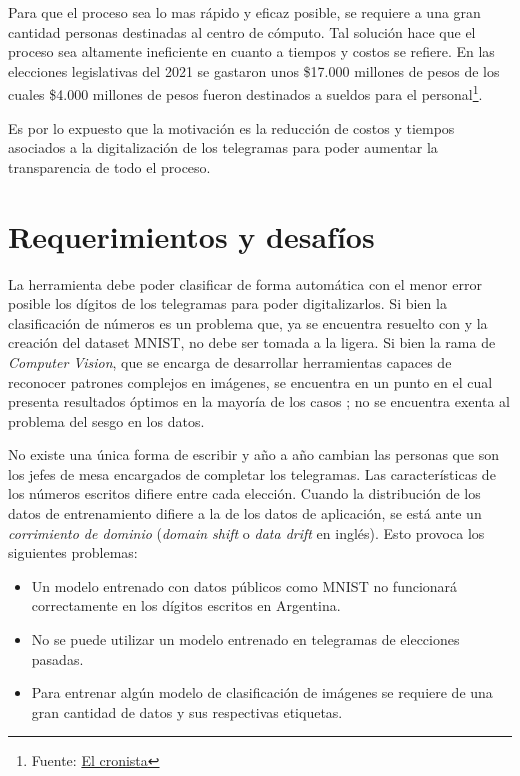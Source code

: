 \documentclass[a4paper, twoside, spanish]{report}
\begin{document}
Para que el proceso sea lo mas r\'apido y eficaz posible, se requiere a una gran cantidad personas destinadas al centro
de c\'omputo. Tal soluci\'on hace que el proceso sea altamente ineficiente en cuanto a tiempos y costos se refiere. En
las elecciones legislativas del 2021 se gastaron unos \$17.000 millones de pesos de los cuales \$4.000 millones de
pesos fueron destinados a sueldos para el personal\footnote{Fuente:
	\href{https://www.cronista.com/economia-politica/Elecciones-legislativas-2021-cuanto-mas-se-gastara-por-el-coronavirus-segun-el-Presupuesto-20201004-0006.html}{El
		cronista}}.

Es por lo expuesto que la motivaci\'on es la reducci\'on de costos y tiempos asociados a la digitalizaci\'on de los
telegramas para poder aumentar la transparencia de todo el proceso.

\section*{Requerimientos y desafíos}

La herramienta debe poder clasificar de forma autom\'atica con el menor error posible los d\'igitos de los telegramas
para poder digitalizarlos. Si bien la clasificaci\'on de n\'umeros es un problema que, ya se encuentra resuelto con
\parencite{lecun1998gradient} y la creaci\'on del dataset MNIST, no debe ser tomada a la ligera. Si bien la rama de {\it
		Computer Vision}, que se encarga de desarrollar herramientas capaces de reconocer patrones complejos en im\'agenes, se
encuentra en un punto en el cual presenta resultados \'optimos en la mayor\'ia de los casos \parencite{szeliski2010computer, redmon2016yolo}; no se encuentra exenta al problema del sesgo en los datos.

No existe una \'unica forma de escribir y a\~{n}o a a\~{n}o cambian las personas que son los jefes de mesa encargados
de completar los telegramas. Las caracter\'isticas de los n\'umeros escritos difiere entre cada elecci\'on. Cuando la
distribuci\'on de los datos de entrenamiento difiere a la de los datos de aplicaci\'on, se est\'a ante un {\it
		corrimiento de dominio} ({\it domain shift} o {\it data drift} en ingl\'es). Esto provoca los siguientes problemas:

\begin{itemize}
	\item Un modelo entrenado con datos p\'ublicos como MNIST no funcionar\'a correctamente en los d\'igitos escritos en
	      Argentina.
	\item No se puede utilizar un modelo entrenado en telegramas de elecciones pasadas.
	\item Para entrenar alg\'un modelo de clasificaci\'on de im\'agenes se requiere de una gran cantidad de datos y sus
	      respectivas etiquetas.
\end{itemize}
\end{document}
